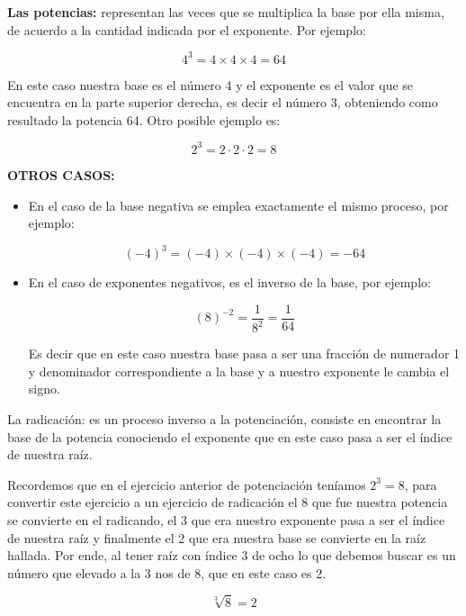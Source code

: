 \documentclass[12pt,a4paper]{article}
\begin{document}
\begin{tcolorbox}[colback=fondoazul,colframe=azuloscuro,title=\textbf{RECUERDA QUE...},fonttitle=\bfseries,breakable]

\textbf{Las potencias:} representan las veces que se multiplica la base por ella misma, de acuerdo a la cantidad indicada por el exponente. Por ejemplo:

$$4^3 = 4 \times 4 \times 4 = 64$$

En este caso nuestra base es el número 4 y el exponente es el valor que se encuentra en la parte superior derecha, es decir el número 3, obteniendo como resultado la potencia 64. Otro posible ejemplo es:

$$2^3 = 2 \cdot 2 \cdot 2 = 8$$

\vspace{0.5cm}

\textbf{OTROS CASOS:}

\begin{itemize}
\item En el caso de la base negativa se emplea exactamente el mismo proceso, por ejemplo:

$$(-4)^3 = (-4) \times (-4) \times (-4) = -64$$

\item En el caso de exponentes negativos, es el inverso de la base, por ejemplo:

$$(8)^{-2} = \frac{1}{8^2} = \frac{1}{64}$$

Es decir que en este caso nuestra base pasa a ser una fracción de numerador 1 y denominador correspondiente a la base y a nuestro exponente le cambia el signo.
\end{itemize}

\end{tcolorbox}

\vspace{0.5cm}

\begin{tcolorbox}[colback=fondoverde,colframe=verdeclaro,title=\textbf{La radicación},fonttitle=\bfseries,breakable]

La radicación: es un proceso inverso a la potenciación, consiste en encontrar la base de la potencia conociendo el exponente que en este caso pasa a ser el índice de nuestra raíz.

Recordemos que en el ejercicio anterior de potenciación teníamos $2^3 = 8$, para convertir este ejercicio a un ejercicio de radicación el 8 que fue nuestra potencia se convierte en el radicando, el 3 que era nuestro exponente pasa a ser el índice de nuestra raíz y finalmente el 2 que era nuestra base se convierte en la raíz hallada. Por ende, al tener raíz con índice 3 de ocho lo que debemos buscar es un número que elevado a la 3 nos de 8, que en este caso es 2.

$$\sqrt[3]{8} = 2$$

\end{tcolorbox}
\end{document}

